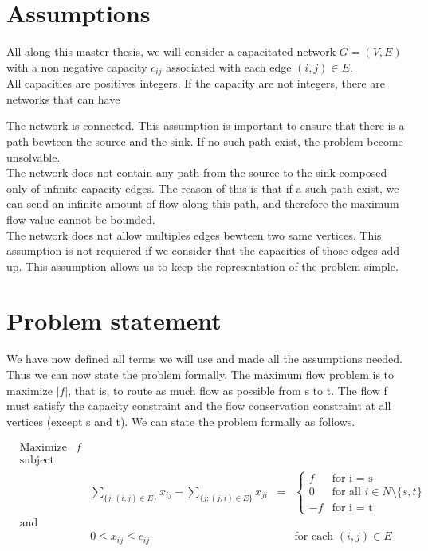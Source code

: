 
\section{Assumptions}

All along this master thesis, we will  consider a capacitated network $G = (V, E)$ with a non negative  capacity $c_{ij}$ associated with each edge $(i, j) \in E$.\\

All capacities are positives integers. If the capacity are not integers, there are networks that can have %

The network is connected. This assumption is important to ensure that there is a path bewteen the source and the sink. If no such path exist, the problem become unsolvable.\\

The network does not contain any path from the source to the sink composed only of infinite capacity edges. The reason of this is that if a such path exist, we can send an infinite amount of flow along this path, and therefore the maximum flow value cannot be bounded. \\

The network does not allow multiples edges bewteen two same vertices. This assumption is not requiered if we consider that the capacities of those edges add up. This assumption allows us to keep the representation of the problem simple.

\section{Problem statement}

We have now defined all terms we will use and made all the assumptions needed. Thus we can now state the problem formally. The maximum flow problem is to maximize $\left\vert{f}\right\vert$, that is, to route as much flow as possible from s to t. The flow f must satisfy the capacity constraint and the flow conservation constraint at all vertices (except s and t). We can state the problem formally as follows.

\begin{equation}
\begin{aligned}
& {\text{Maximize}} & f & & &\\
& \text{subject to} & & & &\\
& & & \sum\limits_{\{j:(i,j)\in E\}} x_{ij} - \sum\limits_{\{j:(j,i)\in E\}} x_{ji} & = & \begin{cases}
               f & \text{for i = s} \\
               0 & \text{for all } i \in N \setminus \{s, t\} \\
               -f & \text{for i = t}
            \end{cases}\\
& \text{and} & & & & \\
& & & 0 \leq x_{ij} \leq c_{ij} & & \text{for each } (i, j) \in E
\end{aligned}
\end{equation}

